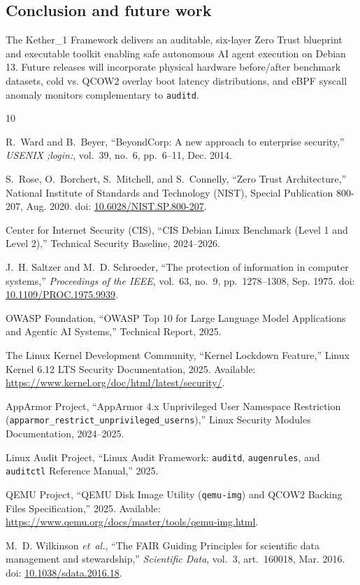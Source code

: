 \documentclass[11pt,a4paper]{article}
\newcommand{\code}[1]{\nolinkurl{#1}}
\begin{document}
\subsection{Conclusion and future work}

The Kether\_1 Framework delivers an auditable, six-layer Zero Trust blueprint and executable toolkit enabling safe autonomous AI agent execution on Debian 13. Future releases will incorporate physical hardware before/after benchmark datasets, cold vs. QCOW2 overlay boot latency distributions, and eBPF syscall anomaly monitors complementary to \code{auditd}.

\begin{thebibliography}{10}

R.~Ward and B.~Beyer, ``BeyondCorp: A new approach to enterprise security,'' \emph{USENIX ;login:}, vol.~39, no.~6, pp.~6--11, Dec. 2014.

S.~Rose, O.~Borchert, S.~Mitchell, and S.~Connelly, ``Zero Trust Architecture,'' National Institute of Standards and Technology (NIST), Special Publication 800-207, Aug. 2020. doi: \href{https://doi.org/10.6028/NIST.SP.800-207}{10.6028/NIST.SP.800-207}.

Center for Internet Security (CIS), ``CIS Debian Linux Benchmark (Level 1 and Level 2),'' Technical Security Baseline, 2024--2026.

J.~H. Saltzer and M.~D. Schroeder, ``The protection of information in computer systems,'' \emph{Proceedings of the IEEE}, vol.~63, no.~9, pp.~1278--1308, Sep. 1975. doi: \href{https://doi.org/10.1109/PROC.1975.9939}{10.1109/PROC.1975.9939}.

OWASP Foundation, ``OWASP Top 10 for Large Language Model Applications and Agentic AI Systems,'' Technical Report, 2025.

The Linux Kernel Development Community, ``Kernel Lockdown Feature,'' Linux Kernel 6.12 LTS Security Documentation, 2025. Available: \url{https://www.kernel.org/doc/html/latest/security/}.

AppArmor Project, ``AppArmor 4.x Unprivileged User Namespace Restriction (\texttt{apparmor\_restrict\_unprivileged\_userns}),'' Linux Security Modules Documentation, 2024--2025.

Linux Audit Project, ``Linux Audit Framework: \code{auditd}, \code{augenrules}, and \code{auditctl} Reference Manual,'' 2025.

QEMU Project, ``QEMU Disk Image Utility (\code{qemu-img}) and QCOW2 Backing Files Specification,'' 2025. Available: \url{https://www.qemu.org/docs/master/tools/qemu-img.html}.

M.~D. Wilkinson \emph{et~al.}, ``The FAIR Guiding Principles for scientific data management and stewardship,'' \emph{Scientific Data}, vol.~3, art.~160018, Mar. 2016. doi: \href{https://doi.org/10.1038/sdata.2016.18}{10.1038/sdata.2016.18}.

\end{thebibliography}
\end{document}
